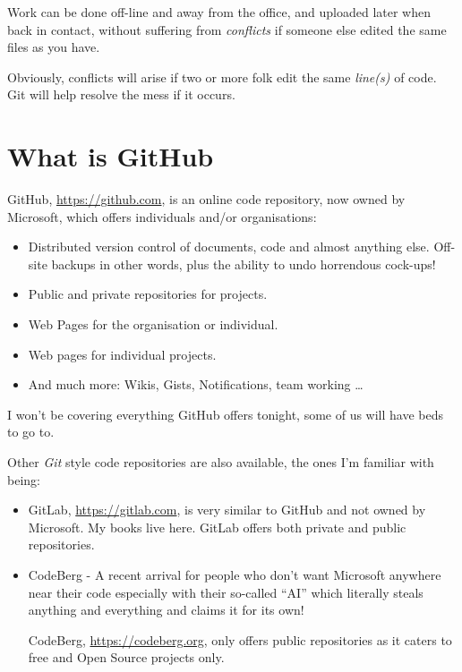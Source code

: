 Work can be done off-line and away from the office, and uploaded later when back in contact, without suffering from \emph{conflicts} if someone else edited the same files as you have.

Obviously, conflicts will arise if two or more folk edit the same \emph{line(s)} of code. Git will help resolve the mess if it occurs.


\section{What is GitHub}
GitHub, \url{https://github.com}, is an online code repository, now owned by Microsoft, which offers individuals and/or organisations:

\begin{itemize}
    \item Distributed version control of documents, code and almost anything else. Off-site backups in other words, plus the ability to undo horrendous cock-ups!
    \item Public and private repositories for projects.
    \item Web Pages for the organisation or individual.
    \item Web pages for individual projects.
    \item And much more: Wikis, Gists, Notifications, team working \ldots
\end{itemize}

I won't be covering everything GitHub offers tonight, some of us will have beds to go to.

Other \emph{Git} style code repositories are also available, the ones I'm familiar with being:

\begin{itemize}
    \item GitLab, \url{https://gitlab.com}, is very similar to GitHub and not owned by Microsoft. My books live here. GitLab offers both private and public repositories.
    \item CodeBerg - A recent arrival for people who don't want Microsoft anywhere near their code especially with their so-called ``AI'' which literally steals anything and everything and claims it for its own!

    CodeBerg, \url{https://codeberg.org}, only offers public repositories as it caters to free and Open Source projects only.
\end{itemize}